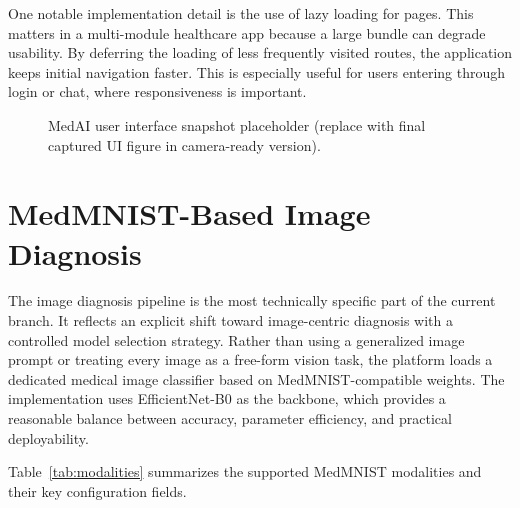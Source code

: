 \documentclass[conference]{IEEEtran}
\begin{document}
One notable implementation detail is the use of lazy loading for pages. This matters in a multi-module healthcare app because a large bundle can degrade usability. By deferring the loading of less frequently visited routes, the application keeps initial navigation faster. This is especially useful for users entering through login or chat, where responsiveness is important.

\begin{figure}[t]
\centering
{}
\caption{MedAI user interface snapshot placeholder (replace with final captured UI figure in camera-ready version).}
\label{fig:website_ui}
\end{figure}

\section{MedMNIST-Based Image Diagnosis}
The image diagnosis pipeline is the most technically specific part of the current branch. It reflects an explicit shift toward image-centric diagnosis with a controlled model selection strategy. Rather than using a generalized image prompt or treating every image as a free-form vision task, the platform loads a dedicated medical image classifier based on MedMNIST-compatible weights. The implementation uses EfficientNet-B0 as the backbone, which provides a reasonable balance between accuracy, parameter efficiency, and practical deployability.

Table~\ref{tab:modalities} summarizes the supported MedMNIST modalities and their key configuration fields.
\end{document}
